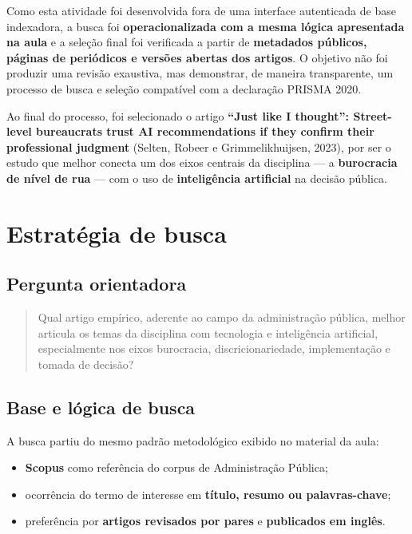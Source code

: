 \documentclass[12pt]{article}
\begin{document}
Como esta atividade foi desenvolvida fora de uma interface autenticada de base indexadora, a busca foi \textbf{operacionalizada com a mesma lógica apresentada na aula} e a seleção final foi verificada a partir de \textbf{metadados públicos, páginas de periódicos e versões abertas dos artigos}. O objetivo não foi produzir uma revisão exaustiva, mas demonstrar, de maneira transparente, um processo de busca e seleção compatível com a declaração PRISMA 2020.

Ao final do processo, foi selecionado o artigo \textbf{“Just like I thought”: Street-level bureaucrats trust AI recommendations if they confirm their professional judgment} (Selten, Robeer e Grimmelikhuijsen, 2023), por ser o estudo que melhor conecta um dos eixos centrais da disciplina — a \textbf{burocracia de nível de rua} — com o uso de \textbf{inteligência artificial} na decisão pública.

\section{Estratégia de busca}
\label{sec:org3737226}

\subsection{Pergunta orientadora}
\label{sec:org8ad7521}

\begin{quote}
Qual artigo empírico, aderente ao campo da administração pública, melhor articula os temas da disciplina com tecnologia e inteligência artificial, especialmente nos eixos burocracia, discricionariedade, implementação e tomada de decisão?
\end{quote}

\subsection{Base e lógica de busca}
\label{sec:org807b51d}

A busca partiu do mesmo padrão metodológico exibido no material da aula:
\begin{itemize}
\item \textbf{Scopus} como referência do corpus de Administração Pública;
\item ocorrência do termo de interesse em \textbf{título, resumo ou palavras-chave};
\item preferência por \textbf{artigos revisados por pares} e \textbf{publicados em inglês}.
\end{itemize}
\end{document}
